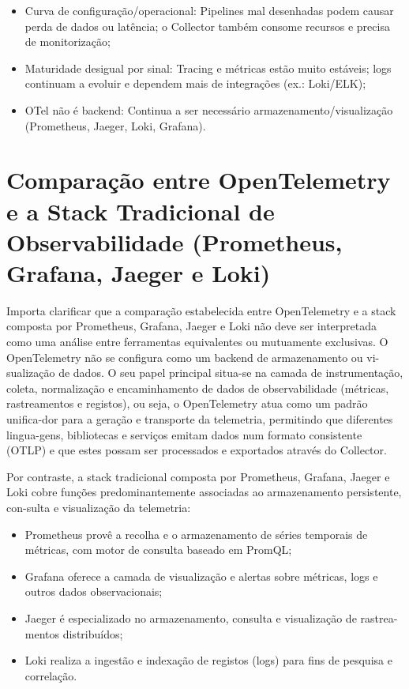 \begin{itemize}
    \item Curva de configuração/operacional: Pipelines mal desenhadas podem causar perda de dados ou latência; o Collector também consome recursos e precisa de monitorização;
    \item Maturidade desigual por sinal: Tracing e métricas estão muito estáveis; logs continuam a evoluir e dependem mais de integrações (ex.: Loki/ELK);
    \item OTel não é backend: Continua a ser necessário armazenamento/visualização (Prometheus, Jaeger, Loki, Grafana).
\end{itemize}

\section{Comparação entre OpenTelemetry e a Stack Tradicional de Observabilidade (Prometheus, Grafana, Jaeger e Loki)}

Importa clarificar que a comparação estabelecida entre OpenTelemetry e a stack composta por Prometheus, Grafana, Jaeger e Loki não deve ser interpretada como uma análise entre ferramentas equivalentes ou mutuamente exclusivas.
O OpenTelemetry não se configura como um backend de armazenamento ou vi-sualização de dados. O seu papel principal situa-se na camada de instrumentação, coleta, normalização e encaminhamento de dados de observabilidade (métricas, rastreamentos e registos), ou seja, o OpenTelemetry atua como um padrão unifica-dor para a geração e transporte da telemetria, permitindo que diferentes lingua-gens, bibliotecas e serviços emitam dados num formato consistente (OTLP) e que estes possam ser processados e exportados através do Collector.

Por contraste, a stack tradicional composta por Prometheus, Grafana, Jaeger e Loki cobre funções predominantemente associadas ao armazenamento persistente, con-sulta e visualização da telemetria:

\begin{itemize}
    \item Prometheus provê a recolha e o armazenamento de séries temporais de métricas, com motor de consulta baseado em PromQL;
    \item Grafana oferece a camada de visualização e alertas sobre métricas, logs e outros dados observacionais;
    \item Jaeger é especializado no armazenamento, consulta e visualização de rastrea-mentos distribuídos;
    \item Loki realiza a ingestão e indexação de registos (logs) para fins de pesquisa e correlação.
\end{itemize}

